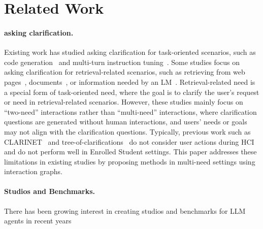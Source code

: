 \documentclass{article} %
\theoremstyle{definition}
\begin{document}
\section{Related Work}

\label{sec:related_work}
\paragraph{asking clarification.}

Existing work has studied asking clarification for task-oriented scenarios, such as code generation~\citep{clarifygpt, benchmark_code_generate} and multi-turn instruction tuning~\citep{proactive_cot}. Some studies focus on asking clarification for retrieval-related scenarios, such as retrieving from web pages~\citep{clarinet}, documents~\citep{multiturn_clarification}, or information needed by an LM~\citep{inscit, star_gate, learn_to_clarify}. Retrieval-related need is a special form of task-oriented need, where the goal is to clarify the user's request or need in retrieval-related scenarios. However, these studies mainly focus on ``two-need'' interactions rather than ``multi-need'' interactions, where clarification questions are generated without human interactions, and users' needs or goals may not align with the clarification questions. Typically, previous work such as CLARINET~\citep{clarinet} and tree-of-clarifications~\citep{tree_of_clarifications} do not consider user actions during HCI and do not perform well in Enrolled Student settings. This paper addresses these limitations in existing studies by proposing methods in multi-need settings using interaction graphs.
\paragraph{Studios and Benchmarks.}
There has been growing interest in creating studios and benchmarks for LLM agents in recent years



\end{document}

